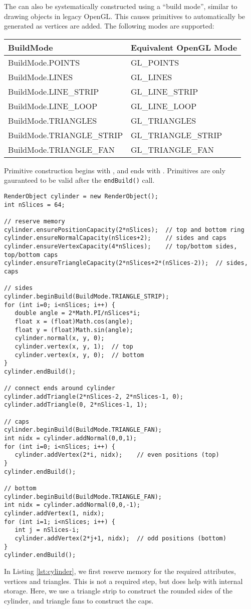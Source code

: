\documentclass{article}
\begin{document}
The  can also be systematically constructed using a ``build mode'',
similar to drawing objects in legacy OpenGL.  This causes primitives to automatically be
generated as vertices are added.  The following modes are supported:
\begin{center}
\begin{tabular}{ll}
   \hline\hline
   BuildMode & Equivalent OpenGL Mode\\
   \hline
   BuildMode.POINTS & GL\_POINTS\\
   BuildMode.LINES & GL\_LINES\\
   BuildMode.LINE\_STRIP & GL\_LINE\_STRIP\\
   BuildMode.LINE\_LOOP & GL\_LINE\_LOOP\\
   BuildMode.TRIANGLES & GL\_TRIANGLES\\
   BuildMode.TRIANGLE\_STRIP & GL\_TRIANGLE\_STRIP\\
   BuildMode.TRIANGLE\_FAN & GL\_TRIANGLE\_FAN\\
   \hline
   \end{tabular}
\end{center}
Primitive construction begins with , and 
ends with  . Primitives are only gauranteed to be valid after 
the \lstinline{endBuild()} call.
\begin{lstlisting}[caption={Building a cylinder}, label=lst:cylinder]
RenderObject cylinder = new RenderObject();
int nSlices = 64;
      
// reserve memory
cylinder.ensurePositionCapacity(2*nSlices);  // top and bottom ring
cylinder.ensureNormalCapacity(nSlices+2);    // sides and caps
cylinder.ensureVertexCapacity(4*nSlices);    // top/bottom sides, top/bottom caps
cylinder.ensureTriangleCapacity(2*nSlices+2*(nSlices-2));  // sides, caps
      
// sides
cylinder.beginBuild(BuildMode.TRIANGLE_STRIP);
for (int i=0; i<nSlices; i++) {
   double angle = 2*Math.PI/nSlices*i;
   float x = (float)Math.cos(angle);
   float y = (float)Math.sin(angle);
   cylinder.normal(x, y, 0);
   cylinder.vertex(x, y, 1);  // top
   cylinder.vertex(x, y, 0);  // bottom
}
cylinder.endBuild();

// connect ends around cylinder
cylinder.addTriangle(2*nSlices-2, 2*nSlices-1, 0);
cylinder.addTriangle(0, 2*nSlices-1, 1);
      
// caps
cylinder.beginBuild(BuildMode.TRIANGLE_FAN);
int nidx = cylinder.addNormal(0,0,1);
for (int i=0; i<nSlices; i++) {
   cylinder.addVertex(2*i, nidx);    // even positions (top)
}
cylinder.endBuild();

// bottom
cylinder.beginBuild(BuildMode.TRIANGLE_FAN);
int nidx = cylinder.addNormal(0,0,-1);
cylinder.addVertex(1, nidx);
for (int i=1; i<nSlices; i++) {
   int j = nSlices-i;
   cylinder.addVertex(2*j+1, nidx);  // odd positions (bottom)
}
cylinder.endBuild();
\end{lstlisting}
In Listing \ref{lst:cylinder}, we first reserve memory for the required attributes, vertices
and triangles.  This is not a required step, but does help with internal storage.  Here,
we use a triangle strip to construct the rounded sides of the cylinder, and triangle fans
to construct the caps.
\end{document}
